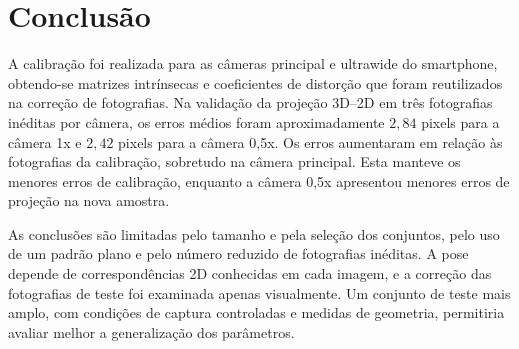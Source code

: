\section{Conclusão}

A calibração foi realizada para as câmeras principal e ultrawide do
smartphone, obtendo-se matrizes intrínsecas e coeficientes de distorção que
foram reutilizados na correção de fotografias. Na validação da projeção
3D--2D em três fotografias inéditas por câmera, os erros médios foram
aproximadamente $2{,}84$ pixels para a câmera 1x e $2{,}42$ pixels para a câmera
0,5x. Os erros aumentaram em relação às fotografias da calibração, sobretudo
na câmera principal. Esta manteve os menores erros de calibração, enquanto
a câmera 0,5x apresentou menores erros de projeção na nova amostra.

As conclusões são limitadas pelo tamanho e pela seleção dos conjuntos, pelo
uso de um padrão plano e pelo número reduzido de fotografias inéditas.
A pose depende de correspondências 2D conhecidas em cada imagem, e a correção
das fotografias de teste foi examinada apenas visualmente. Um conjunto de teste
mais amplo, com condições de captura controladas e medidas de geometria,
permitiria avaliar melhor a generalização dos parâmetros.
